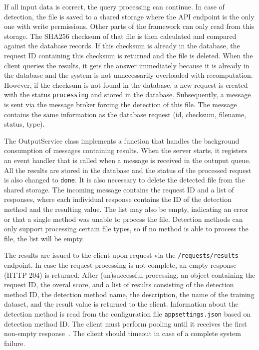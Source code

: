 If all input data is correct, the query processing can continue. In case of detection, the file is saved to a shared storage where the API endpoint is the only one with write permissions. Other parts of the framework can only read from this storage. The SHA256 checksum of that file is then calculated and compared against the database records. If this checksum is already in the database, the request ID containing this checksum is returned and the file is deleted. When the client queries the results, it gets the answer immediately because it is already in the database and the system is not unnecessarily overloaded with recomputation. However, if the checksum is not found in the database, a new request is created with the status \texttt{processing} and stored in the database. Subsequently, a message is sent via the message broker forcing the detection of this file. The message contains the same information as the database request (id, checksum, filename, status, type).

The OutputService class implements a function that handles the background consumption of messages containing results. When the server starts, it registers an event handler that is called when a message is received in the outuput queue. All the results are stored in the database and the status of the processed request is also changed to \texttt{done}. It is also necessary to delete the detected file from the shared storage. The incoming message contains the request ID and a list of responses, where each individual response contains the ID of the detection method and the resulting value. The list may also be empty, indicating an error or that a single method was unable to process the file. Detection methods can only support processing certain file types, so if no method is able to process the file, the list will be empty.

The results are issued to the client upon request via the \texttt{/requests/results} endpoint. In case the request processing is not complete, an empty response (HTTP 204) is returned. After (un)successful processing, an object containing the request ID, the overal score, and a list of results consisting of the detection method ID, the detection method name, the description, the name of the training dataset, and the result value is returned to the client. Information about the detection method is read from the configuration file \texttt{appsettings.json} based on detection method ID. The client must perform pooling until it receives the first non-empty response~\cite{Pooling}. The client should timeout in case of a complete system failure.

